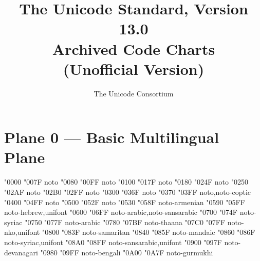 \documentclass{article}
\title{The Unicode Standard, Version 13.0\\
  Archived Code Charts\\
  (Unofficial Version)}
\author{The Unicode Consortium}
\begin{document}
\maketitle
\tableofcontents

\section{Plane 0 --- Basic Multilingual Plane}

                    {  "0000} {  "007F} {noto}
             {  "0080} {  "00FF} {noto}
                               {  "0100} {  "017F} {noto}
                               {  "0180} {  "024F} {noto}
                                 {  "0250} {  "02AF} {noto}
                       {  "02B0} {  "02FF} {noto}
                    {  "0300} {  "036F} {noto}
                               {  "0370} {  "03FF} {noto,noto-coptic}
                                       {  "0400} {  "04FF} {noto}
                            {  "0500} {  "052F} {noto}
                                       {  "0530} {  "058F} {noto-armenian}
                                         {  "0590} {  "05FF} {noto-hebrew,unifont}
                                         {  "0600} {  "06FF} {noto-arabic,noto-sansarabic}
                                         {  "0700} {  "074F} {noto-syriac}
                              {  "0750} {  "077F} {noto-arabic}
                                         {  "0780} {  "07BF} {noto-thaana}
                                            {  "07C0} {  "07FF} {noto-nko,unifont}
                                      {  "0800} {  "083F} {noto-samaritan}
                                        {  "0840} {  "085F} {noto-mandaic}
                              {  "0860} {  "086F} {noto-syriac,unifont}
                              {  "08A0} {  "08FF} {noto-sansarabic,unifont}
                                     {  "0900} {  "097F} {noto-devanagari}
                                        {  "0980} {  "09FF} {noto-bengali}
                                       {  "0A00} {  "0A7F} {noto-gurmukhi}
\end{document}
